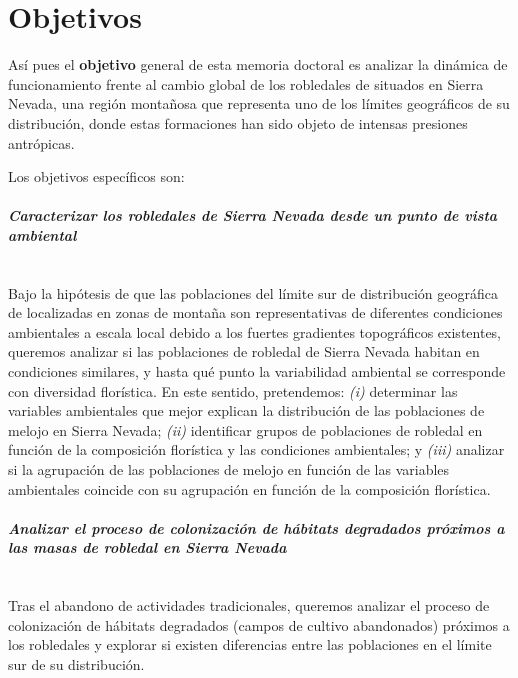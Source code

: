 \section{Objetivos}\label{sec:intro:objetivos}
Así pues el \textbf{objetivo} general de esta memoria doctoral es analizar la dinámica de funcionamiento frente al cambio global de los robledales de \Qp situados en Sierra Nevada, una región montañosa que representa uno de los límites geográficos de su distribución, donde estas formaciones han sido objeto de intensas presiones antrópicas. 

Los objetivos específicos son: 

\paragraph{\emph{Caracterizar los robledales de Sierra Nevada desde un punto de vista \\ ambiental}}\mbox{} \\
Bajo la hipótesis de que las poblaciones del límite sur de distribución geográfica de \Qp localizadas en zonas de montaña son representativas de diferentes condiciones ambientales a escala local debido a los fuertes gradientes topográficos existentes, queremos analizar si las poblaciones de robledal de Sierra Nevada habitan en condiciones similares, y hasta qué punto la variabilidad ambiental se corresponde con diversidad florística. En este sentido, pretendemos: \emph{(i)} determinar las variables ambientales que mejor explican la distribución de las poblaciones de melojo en Sierra Nevada; \emph{(ii)} identificar grupos de poblaciones de robledal en función de la composición florística y las condiciones ambientales; y \emph{(iii)} analizar si la agrupación de las poblaciones de melojo en función de las variables ambientales coincide con su agrupación en función de la composición florística.

\paragraph{\emph{Analizar el proceso de colonización de hábitats degradados próximos a las masas de robledal en Sierra Nevada}}\mbox{} \\
Tras el abandono de actividades tradicionales, queremos analizar el proceso de colonización de hábitats degradados (campos de cultivo abandonados) próximos a los robledales y explorar si existen diferencias entre las poblaciones en el límite sur de su distribución. 

